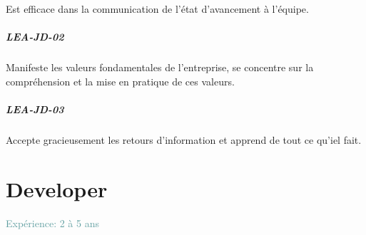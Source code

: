 \documentclass[a4paper, french, openany, 12pt]{book}
\newcommand\cha[1]{\textcolor{OliveGreen}{\textbf{\uppercase{lea-{#1}}}}}
\newcommand\xp[1]{\textcolor{CadetBlue}{Expérience: {#1} ans}}
\begin{document}
\begin{multicols}{2}
  Est efficace dans la communication de l'état d'avancement à l'équipe.

  \paragraph{\cha{jd-02}}

  Manifeste les valeurs fondamentales de l'entreprise, se concentre sur la compréhension et la mise en pratique de ces 
  valeurs.

  \paragraph{\cha{jd-03}}

  Accepte gracieusement les retours d'information et apprend de tout ce qu'iel fait.
\end{multicols}

\chapter{Developer}

\xp{2 à 5}
\end{document}
